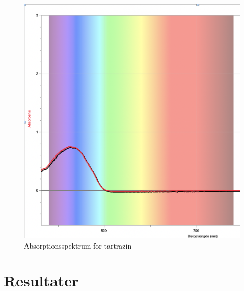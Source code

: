 \documentclass[11pt]{article}
\theoremstyle{definition}
\begin{document}
\begin{figure}[H]
\begin{center}
  \includegraphics[width=\textwidth]{absorption.png}
\end{center}
\caption{Absorptionsspektrum for tartrazin}
\label{fig:absorption}
\end{figure}


\section{Resultater}
\end{document}
